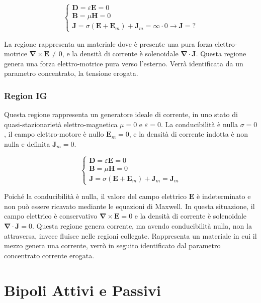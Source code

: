 \documentclass{article}
\newcommand{\vect}[1]{\boldsymbol{\mathbf{#1}}}
\numberwithin{equation}{subsection}
\begin{document}
\begin{equation*}
    \begin{cases}
        \vect{D}=\varepsilon\vect{E}=0\\
        \vect{B}=\mu\vect{H}=0\\
        \vect{J}=\sigma(\vect{E}+\vect{E}_m)+\vect{J}_m=\infty\cdot0\to\vect{J}=?
    \end{cases}
\end{equation*}

La regione rappresenta un materiale dove è presente una pura forza elettro-motrice $\vect\nabla\times\vect{E}\neq0$, e la densità di corrente è solenoidale $\vect\nabla\cdot\vect{J}$. 
Questa regione genera una forza elettro-motrice pura verso l'esterno. 
Verrà identificata da un parametro concentrato, la tensione erogata.

\subsubsection{Region IG}

Questa regione rappresenta un generatore ideale di corrente, in uno stato di quasi-stazionarietà elettro-magnetica $\mu=0$ e $\varepsilon=0$. La conducibilità è nulla $\sigma=0$, 
il campo elettro-motore è nullo $\vect{E}_m=0$, e la densità di corrente indotta è non nulla e definita $\vect{J}_m=0$. 

\begin{equation*}
    \begin{cases}
        \vect{D}=\varepsilon\vect{E}=0\\
        \vect{B}=\mu\vect{H}=0\\
        \vect{J}=\sigma(\vect{E}+\vect{E}_m)+\vect{J}_m=\vect{J}_m
    \end{cases}
\end{equation*}

Poiché la conducibilità è nulla, il valore del campo elettrico $\vect{E}$ è indeterminato e non può essere ricavato mediante le equazioni di Maxwell. In 
questa situazione, il campo elettrico è conservativo $\vect\nabla\times\vect{E}=0$ e la densità di corrente è solenoidale $\vect\nabla\cdot\vect{J}=0$. 
Questa regione genera corrente, ma avendo conducibilità nulla, non la attraversa, invece fluisce nelle regioni collegate. Rappresenta un materiale in cui il 
mezzo genera una corrente, verrò in seguito identificato dal parametro concentrato corrente erogata.

\clearpage

\section{Bipoli Attivi e Passivi}
\end{document}
